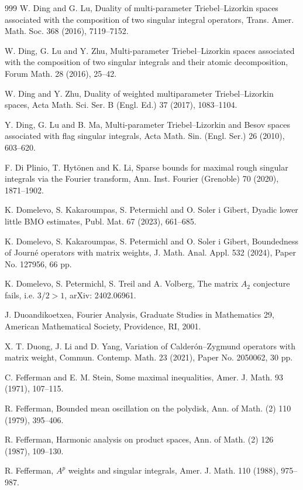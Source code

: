 \documentclass[11pt, reqno]{amsart}
\theoremstyle{definition}
\theoremstyle{remark}
\numberwithin{equation}{section}
\begin{document}
\begin{thebibliography}{999}
W. Ding and G. Lu,
Duality of multi-parameter Triebel--Lizorkin spaces associated with
the composition of two singular integral operators,
Trans. Amer. Math. Soc. 368 (2016), 7119--7152.

W. Ding, G. Lu and Y. Zhu,
Multi-parameter Triebel--Lizorkin spaces associated with
the composition of two singular integrals and their atomic decomposition,
Forum Math. 28 (2016), 25--42.

W. Ding and Y. Zhu,
Duality of weighted multiparameter Triebel--Lizorkin spaces,
Acta Math. Sci. Ser. B (Engl. Ed.) 37 (2017), 1083--1104.

Y. Ding, G. Lu and B. Ma,
Multi-parameter Triebel--Lizorkin and Besov spaces associated with flag singular integrals,
Acta Math. Sin. (Engl. Ser.) 26 (2010), 603--620.

F. Di Plinio, T. Hyt\"{o}nen and K. Li,
Sparse bounds for maximal rough singular
integrals via the Fourier transform,
Ann. Inst. Fourier (Grenoble) 70 (2020), 1871--1902.

K. Domelevo, S. Kakaroumpas, S. Petermichl and O. Soler i Gibert,
Dyadic lower little BMO estimates,
Publ. Mat. 67 (2023), 661--685.

K. Domelevo, S. Kakaroumpas, S. Petermichl and O. Soler i Gibert,
Boundedness of Journ\'e operators with matrix weights,
J. Math. Anal. Appl. 532 (2024), Paper No. 127956, 66 pp.

K. Domelevo, S. Petermichl, S. Treil and A. Volberg,
The matrix $A_2$ conjecture fails, i.e. $3/2 > 1$,
arXiv: 2402.06961.

J. Duoandikoetxea,
Fourier Analysis,
Graduate Studies in Mathematics 29,
American Mathematical Society, Providence, RI, 2001.

X. T. Duong, J. Li and D. Yang,
Variation of Calder\'on--Zygmund operators with matrix weight,
Commun. Contemp. Math. 23 (2021), Paper No. 2050062, 30 pp.

C. Fefferman and E. M. Stein,
Some maximal inequalities,
Amer. J. Math. 93 (1971), 107--115.

R. Fefferman,
Bounded mean oscillation on the polydisk,
Ann. of Math. (2) 110 (1979), 395--406.

R. Fefferman,
Harmonic analysis on product spaces,
Ann. of Math. (2) 126 (1987), 109--130.

R. Fefferman,
$A^p$ weights and singular integrals,
Amer. J. Math. 110 (1988), 975--987.


\end{thebibliography}
\end{document}
